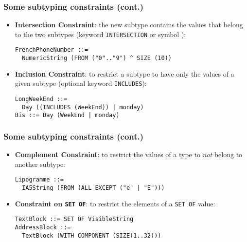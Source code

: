 \documentclass[compress,dvips,xcolor={dvipsnames},t]{beamer}
\begin{document}
\begin{frame}[containsverbatim]
\frametitle{Some subtyping constraints (cont.)}

\begin{itemize}

  \item \textbf{Intersection Constraint}: the new subtype contains the
        values that belong to the two subtypes (keyword
        \texttt{INTERSECTION} or symbol \texttt{}):

\begin{verbatim}
FrenchPhoneNumber ::= 
  NumericString (FROM ("0".."9") ^ SIZE (10))
\end{verbatim}

  \item \textbf{Inclusion Constraint}: to restrict a subtype to have
        only the values of a given subtype (optional keyword
        \texttt{INCLUDES}):

\begin{verbatim}
LongWeekEnd ::=
  Day ((INCLUDES (WeekEnd)) | monday)
Bis ::= Day (WeekEnd | monday)
\end{verbatim}
\end{itemize}

\end{frame}

\begin{frame}[containsverbatim]
\frametitle{Some subtyping constraints (cont.)}

\begin{itemize}

  \item \textbf{Complement Constraint}: to restrict the values of a
        type to \emph{not} belong to another subtype:

\begin{verbatim}
Lipogramme ::=
  IA5String (FROM (ALL EXCEPT ("e" | "E")))
\end{verbatim}

\bigskip\bigskip

  \item \textbf{Constraint on \texttt{SET OF}}: to restrict the
        elements of a \texttt{SET OF} value:

\begin{verbatim}
TextBlock ::= SET OF VisibleString
AddressBlock ::=
  TextBlock (WITH COMPONENT (SIZE(1..32)))
\end{verbatim}

\end{itemize}

\end{frame}
\end{document}
